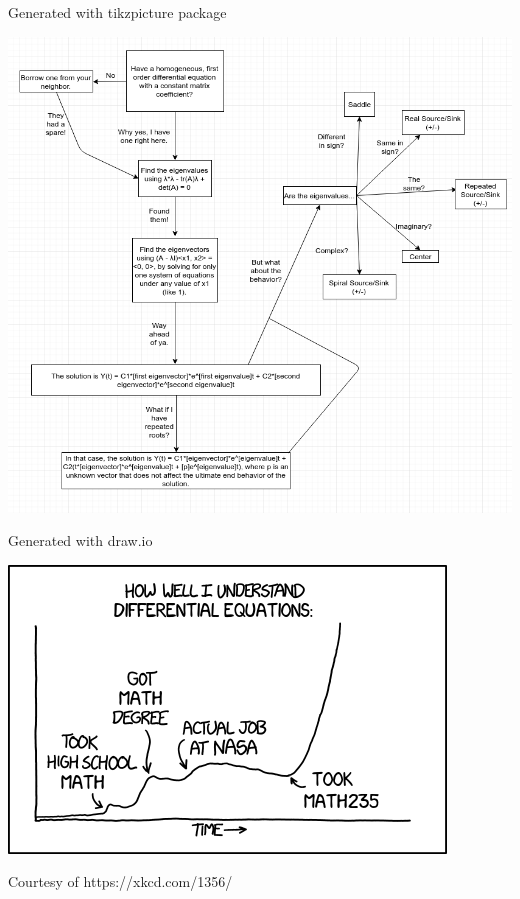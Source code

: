 \documentclass[10pt]{extarticle}
\begin{document}
\small{Generated with tikzpicture package}


\hfill

\includegraphics[width=\textwidth,height=\textheight,keepaspectratio]{flow}

\small{Generated with draw.io}

\hfill


\includegraphics{xkcd}

\small{Courtesy of https://xkcd.com/1356/}
\end{document}
